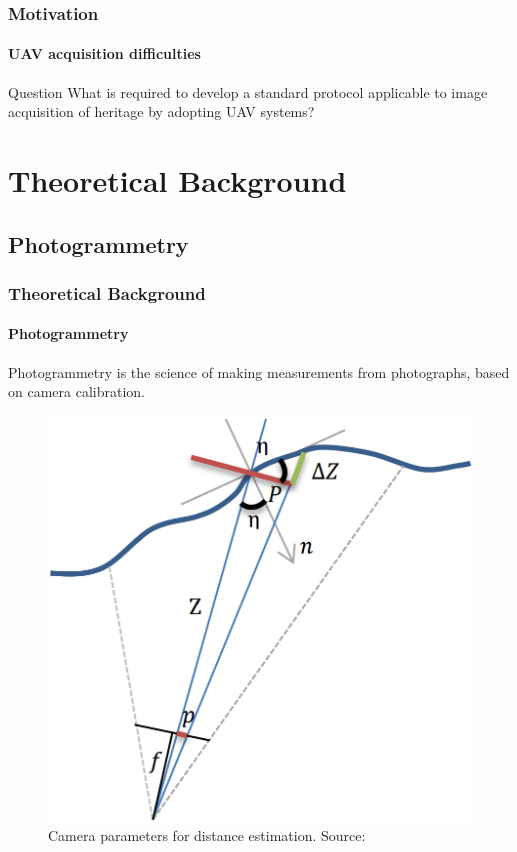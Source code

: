 \documentclass{beamer}
\begin{document}
\begin{frame}
    \frametitle{Motivation}
    \framesubtitle{UAV acquisition difficulties}
    \justifying 
    
    \begin{block}{Question}
   What is required to develop a standard protocol applicable to image acquisition of heritage by adopting UAV systems?
    \end{block}    
    
\end{frame}

\section{Theoretical Background}
\subsection{Photogrammetry}
\begin{frame}
  \frametitle{Theoretical Background}
  \framesubtitle{Photogrammetry}
  \justifying
   Photogrammetry is the science of making measurements from photographs, based on camera calibration.  
   
   \begin{figure}
        \centering
        \includegraphics[scale=.15]{images/cam_par}
        \caption{Camera parameters for distance estimation. Source: \citep{wenzel2013image}}
    \end{figure}

\end{frame}
\end{document}
